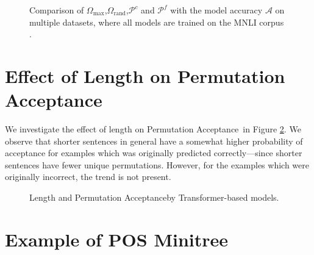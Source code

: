 \documentclass[11pt,a4paper]{article}
\newcommand{\PermAcc}{Permutation Acceptance} %
\begin{document}



\clearpage

\appendix


\begin{figure}[t]
    \centering
    \caption{Comparison of $\Omega_{\text{max}}$,$\Omega_{\text{rand}}$,$\mathcal{P}^c$ and $\mathcal{P}^f$ with the model accuracy $\mathcal{A}$ on multiple datasets, where all models are trained on the MNLI corpus \cite{williams-etal-2018-broad}.}
    \label{fig:comb_plot}
\end{figure}

% 


\section{Effect of Length on \PermAcc}
\label{app_sec:length}

We investigate the effect of length on \PermAcc\ in Figure \ref{fig:length}. We observe that shorter sentences in general have a somewhat higher probability of acceptance for examples which was originally predicted correctly---since shorter sentences have fewer unique permutations. However, for the examples which were originally incorrect, the trend is not present.  

\begin{figure}[ht]
    \centering
    \caption{Length and \PermAcc by Transformer-based models.}
    \label{fig:length}
\end{figure}

\section{Example of POS Minitree}
\end{document}
